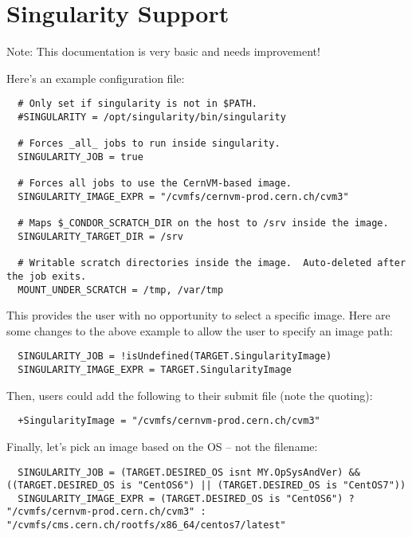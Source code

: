 \section{Singularity Support}\label{sec:singularity-support}


Note:  This documentation is very basic and needs improvement!

Here's an example configuration file:

\begin{verbatim}
  # Only set if singularity is not in $PATH.
  #SINGULARITY = /opt/singularity/bin/singularity

  # Forces _all_ jobs to run inside singularity.
  SINGULARITY_JOB = true

  # Forces all jobs to use the CernVM-based image.
  SINGULARITY_IMAGE_EXPR = "/cvmfs/cernvm-prod.cern.ch/cvm3"

  # Maps $_CONDOR_SCRATCH_DIR on the host to /srv inside the image.
  SINGULARITY_TARGET_DIR = /srv

  # Writable scratch directories inside the image.  Auto-deleted after the job exits.
  MOUNT_UNDER_SCRATCH = /tmp, /var/tmp
\end{verbatim}

This provides the user with no opportunity to select a specific image.
Here are some changes to the above example to allow the user to specify an
image path:

\begin{verbatim}
  SINGULARITY_JOB = !isUndefined(TARGET.SingularityImage)
  SINGULARITY_IMAGE_EXPR = TARGET.SingularityImage
\end{verbatim}

Then, users could add the following to their submit file
(note the quoting):

\begin{verbatim}
  +SingularityImage = "/cvmfs/cernvm-prod.cern.ch/cvm3"
\end{verbatim}

Finally, let's pick an image based on the OS -- not the filename:

\begin{verbatim}
  SINGULARITY_JOB = (TARGET.DESIRED_OS isnt MY.OpSysAndVer) && ((TARGET.DESIRED_OS is "CentOS6") || (TARGET.DESIRED_OS is "CentOS7"))
  SINGULARITY_IMAGE_EXPR = (TARGET.DESIRED_OS is "CentOS6") ? "/cvmfs/cernvm-prod.cern.ch/cvm3" : "/cvmfs/cms.cern.ch/rootfs/x86_64/centos7/latest"
\end{verbatim}

